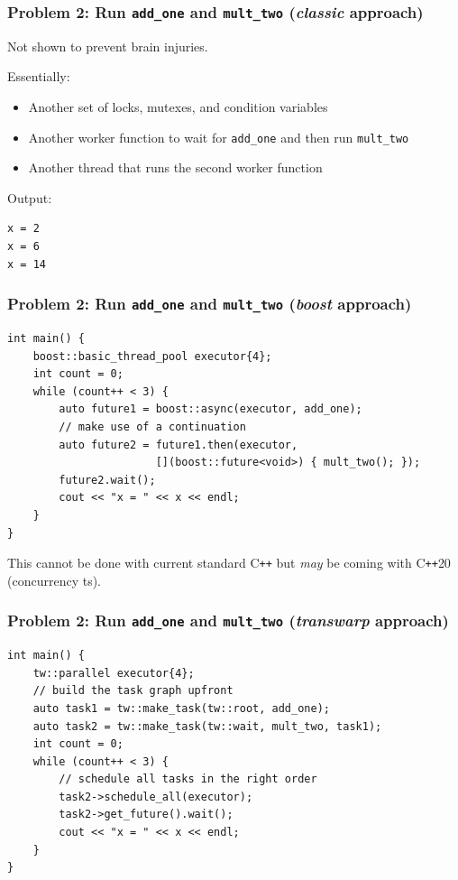 \documentclass[12pt,aspectratio=169]{beamer}
\begin{document}
\begin{frame}[fragile]
\frametitle{Problem 2: Run \lstinline{add_one} and \lstinline{mult_two} (\textit{classic} approach)}

Not shown to prevent brain injuries.

\bigskip
\bigskip

Essentially:
\begin{itemize}
\item Another set of locks, mutexes, and condition variables
\item Another worker function to wait for \lstinline{add_one} and then run \lstinline{mult_two}
\item Another thread that runs the second worker function
\end{itemize}
\bigskip
\bigskip

Output:
\begin{verbatim}
x = 2
x = 6
x = 14
\end{verbatim}
\end{frame}

\begin{frame}[fragile]
\frametitle{Problem 2: Run \lstinline{add_one} and \lstinline{mult_two} (\textit{boost} approach)}

\begin{lstlisting}
int main() {
    boost::basic_thread_pool executor{4};
    int count = 0;
    while (count++ < 3) {
        auto future1 = boost::async(executor, add_one);
        // make use of a continuation
        auto future2 = future1.then(executor, 
                       [](boost::future<void>) { mult_two(); });
        future2.wait();
        cout << "x = " << x << endl;
    }
}
\end{lstlisting}

This cannot be done with current standard C\texttt{++} but \textit{may} be coming with C\texttt{++}20 (concurrency ts).

\end{frame}

\begin{frame}[fragile]
\frametitle{Problem 2: Run \lstinline{add_one} and \lstinline{mult_two} (\textit{transwarp} approach)}

\begin{lstlisting}
int main() {
    tw::parallel executor{4};
    // build the task graph upfront
    auto task1 = tw::make_task(tw::root, add_one);
    auto task2 = tw::make_task(tw::wait, mult_two, task1);
    int count = 0;
    while (count++ < 3) {
        // schedule all tasks in the right order
        task2->schedule_all(executor); 
        task2->get_future().wait();
        cout << "x = " << x << endl;
    }
}
\end{lstlisting}

\end{frame}
\end{document}
